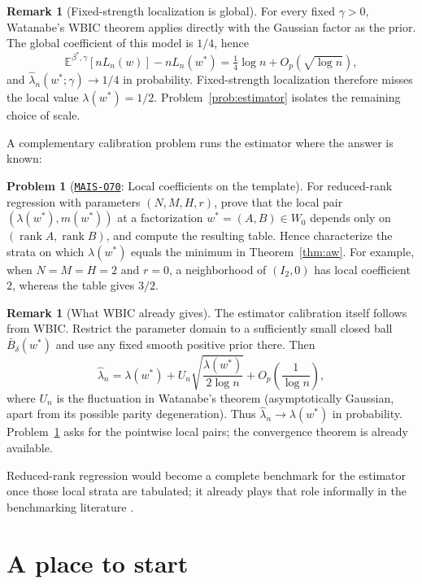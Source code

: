 \documentclass[11pt]{amsart}
\newcommand{\Oid}[1]{\href{https://github.com/lionellevine/MAIS/blob/main/open-problems/MAIS-O#1.md}{\texttt{MAIS-O#1}}}
\theoremstyle{plain}
\theoremstyle{definition}
\newtheorem{problem}[theorem]{Problem}
\newtheorem{remark}[theorem]{Remark}
\newcommand{\E}{\mathbb{E}}
\DeclareMathOperator{\rank}{rank}
\begin{document}
\begin{remark}[Fixed-strength localization is global]
For every fixed $\gamma>0$, Watanabe's WBIC theorem \cite{watanabe2013} applies directly with the Gaussian factor as the prior. The global coefficient of this model is $1/4$, hence
\[
 \E^{\beta^*,\gamma}[nL_n(w)]-nL_n(w^*)
 =\tfrac14\log n+O_p(\sqrt{\log n}),
\]
and $\hat\lambda_n(w^*;\gamma)\to1/4$ in probability. Fixed-strength localization therefore misses the local value $\lambda(w^*)=1/2$. Problem~\ref{prob:estimator} isolates the remaining choice of scale.
\end{remark}

A complementary calibration problem runs the estimator where the answer is known:

\begin{problem}[\Oid{70}: Local coefficients on the template]\label{prob:calibration}
For reduced-rank regression with parameters $(N,M,H,r)$, prove that the local pair $(\lambda(w^*),m(w^*))$ at a factorization $w^*=(A,B)\in W_0$ depends only on $(\rank A,\rank B)$, and compute the resulting table. Hence characterize the strata on which $\lambda(w^*)$ equals the minimum in Theorem~\textup{\ref{thm:aw}}. For example, when $N=M=H=2$ and $r=0$, a neighborhood of $(I_2,0)$ has local coefficient $2$, whereas the table gives $3/2$.
\end{problem}

\begin{remark}[What WBIC already gives]
The estimator calibration itself follows from WBIC. Restrict the parameter domain to a sufficiently small closed ball $\bar B_\delta(w^*)$ and use any fixed smooth positive prior there. Then
\[
 \hat\lambda_n
 =\lambda(w^*)+
 U_n\sqrt{\frac{\lambda(w^*)}{2\log n}}
 +O_p\!\left(\frac1{\log n}\right),
\]
where $U_n$ is the fluctuation in Watanabe's theorem (asymptotically Gaussian, apart from its possible parity degeneration). Thus $\hat\lambda_n\to\lambda(w^*)$ in probability. Problem~\ref{prob:calibration} asks for the pointwise local pairs; the convergence theorem is already available.
\end{remark}

Reduced-rank regression would become a complete benchmark for the estimator once those local strata are tabulated; it already plays that role informally in the benchmarking literature \cite{hitchcock2025}.

\section{A place to start}\label{sec:start}
\end{document}

